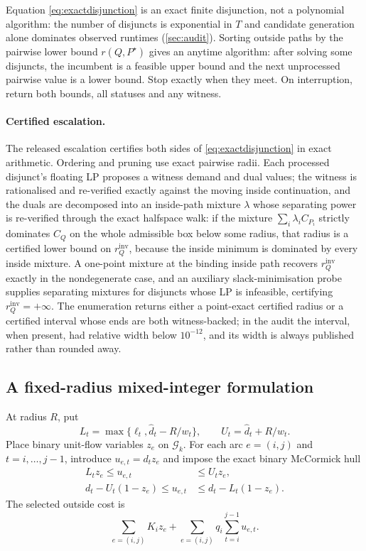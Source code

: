 \documentclass[11pt]{article}
\theoremstyle{definition}
\newcommand{\cG}{\mathcal{G}}
\newcommand{\dhat}{\widehat d}
\newcommand{\ellv}{\ell}
\begin{document}
Equation \eqref{eq:exactdisjunction} is an exact finite disjunction, not a polynomial algorithm: the number of disjuncts is exponential in $T$ and candidate generation alone dominates observed runtimes (\cref{sec:audit}). Sorting outside paths by the pairwise lower bound $r(Q,P^\star)$ gives an anytime algorithm: after solving some disjuncts, the incumbent is a feasible upper bound and the next unprocessed pairwise value is a lower bound. Stop exactly when they meet. On interruption, return both bounds, all statuses and any witness.

\paragraph{Certified escalation.}
The released escalation certifies both sides of \eqref{eq:exactdisjunction} in exact arithmetic. Ordering and pruning use exact pairwise radii. Each processed disjunct's floating LP proposes a witness demand and dual values; the witness is rationalised and re-verified exactly against the moving inside continuation, and the duals are decomposed into an inside-path mixture $\lambda$ whose separating power is re-verified through the exact halfspace walk: if the mixture $\sum_i\lambda_iC_{P_i}$ strictly dominates $C_Q$ on the whole admissible box below some radius, that radius is a certified lower bound on $r_Q^{\mathrm{inv}}$, because the inside minimum is dominated by every inside mixture. A one-point mixture at the binding inside path recovers $r_Q^{\mathrm{inv}}$ exactly in the nondegenerate case, and an auxiliary slack-minimisation probe supplies separating mixtures for disjuncts whose LP is infeasible, certifying $r_Q^{\mathrm{inv}}=+\infty$. The enumeration returns either a point-exact certified radius or a certified interval whose ends are both witness-backed; in the audit the interval, when present, had relative width below $10^{-12}$, and its width is always published rather than rounded away.

\subsection{A fixed-radius mixed-integer formulation}

At radius $R$, put
\[
L_t=\max\{\ellv_t,\dhat_t-R/w_t\},
\qquad U_t=\dhat_t+R/w_t.
\]
Place binary unit-flow variables $z_e$ on $\cG_k$. For each arc $e=(i,j)$ and $t=i,\ldots,j-1$, introduce $u_{e,t}=d_tz_e$ and impose the exact binary McCormick hull
\begin{align}
L_tz_e\le u_{e,t}&\le U_tz_e,\label{eq:mcc1}\\
d_t-U_t(1-z_e)\le u_{e,t}&\le d_t-L_t(1-z_e).\label{eq:mcc2}
\end{align}
The selected outside cost is
\begin{equation}\label{eq:milpcost}
\sum_{e=(i,j)}K_i z_e+
\sum_{e=(i,j)}q_i\sum_{t=i}^{j-1}u_{e,t}.
\end{equation}
\end{document}
